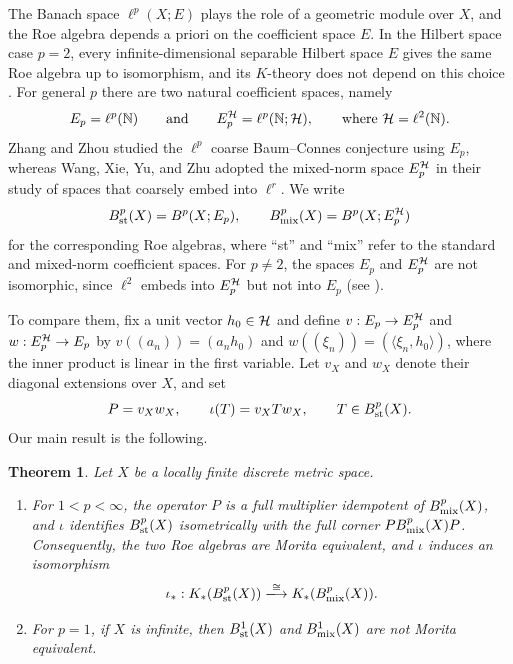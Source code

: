 \documentclass[11pt,reqno]{amsart}
\theoremstyle{definition}
\theoremstyle{plain}
\newtheorem{Thm}[Def]{Theorem}
\def\IN{\mathbb N}\def\IR{\mathbb R}\def\IE{\mathbb E}\def\IC{\mathbb C}\def\IL{\mathbb L}\def\IQ{\mathbb Q}\def\IA{\mathbb A}\def\IZ{\mathbb Z}
\begin{document}
The Banach space $\ell^p(X;E)$ plays the role of a geometric module over $X$, and the Roe algebra depends a priori on the coefficient space $E$. In the Hilbert space case $p=2$, every infinite-dimensional separable Hilbert space $E$ gives the same Roe algebra up to isomorphism, and its $K$-theory does not depend on this choice \cite{WY20}. For general $p$ there are two natural coefficient spaces, namely
\[
E_p=\ell^p(\IN)\qquad\text{and}\qquad E_p^{\H}=\ell^p(\IN;\H),\qquad\text{where }\H=\ell^2(\IN).
\]
Zhang and Zhou \cite{Zha21} studied the $\ell^p$ coarse Baum--Connes conjecture using $E_p$, whereas Wang, Xie, Yu, and Zhu \cite{WXYZ24} adopted the mixed-norm space $E_p^{\mathcal H}$ in their study of spaces that coarsely embed into $\ell^r$. We write
\[
B^p_{\textup{st}}(X)=B^p(X;E_p),\qquad B^p_{\textup{mix}}(X)=B^p(X;E_p^{\mathcal H})
\]
for the corresponding Roe algebras, where ``st'' and ``mix'' refer to the standard and mixed-norm coefficient spaces. For $p\ne2$, the spaces $E_p$ and $E_p^{\mathcal H}$ are not isomorphic, since $\ell^2$ embeds into $E_p^{\mathcal H}$ but not into $E_p$ (see \cite[Chapter~2]{AK16}).

To compare them, fix a unit vector $h_0\in\mathcal H$ and define $v:E_p\to E_p^{\mathcal H}$ and $w:E_p^{\mathcal H}\to E_p$ by $v((a_n))=(a_nh_0)$ and $w((\xi_n))=(\langle\xi_n,h_0\rangle)$, where the inner product is linear in the first variable. Let $v_X$ and $w_X$ denote their diagonal extensions over $X$, and set
\begin{equation}\label{eq:corner_map}
P=v_Xw_X,\qquad \iota(T)=v_XTw_X,\qquad T\in B^p_{\textup{st}}(X).
\end{equation}
Our main result is the following.


\begin{Thm}\label{thm:main}
Let $X$ be a locally finite discrete metric space.
\begin{enumerate}[(1)]
\item For $1<p<\infty$, the operator $P$ is a full multiplier idempotent of $B^p_{\textup{mix}}(X)$, and $\iota$ identifies $B^p_{\textup{st}}(X)$ isometrically with the full corner $PB^p_{\textup{mix}}(X)P$. Consequently, the two Roe algebras are Morita equivalent, and $\iota$ induces an isomorphism
\[
\iota_*:K_*(B^p_{\textup{st}}(X))\xlongrightarrow{\cong}K_*(B^p_{\textup{mix}}(X)).
\]
\item For $p=1$, if $X$ is infinite, then $B^1_{\textup{st}}(X)$ and $B^1_{\textup{mix}}(X)$ are not Morita equivalent.
\end{enumerate}
\end{Thm}
\end{document}
